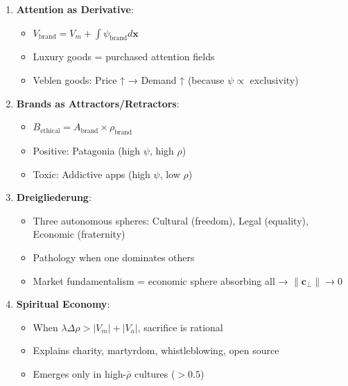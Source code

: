 \documentclass[11pt,a4paper]{article}
\theoremstyle{definition}
\theoremstyle{remark}
\newcommand{\cc}{\mathbf{c}}
\begin{document}
\begin{enumerate}
\begin{mdframed}[backgroundcolor=green!10,linewidth=2pt,linecolor=green!70!black]
\begin{enumerate}[nosep]
    \item \textbf{Attention as Derivative}:
        \begin{itemize}[nosep]
            \item \(V_{\text{brand}} = V_m + \int \psi_{\text{brand}} d\mathbf{x}\)
            \item Luxury goods = purchased attention fields
            \item Veblen goods: Price ↑ → Demand ↑ (because \(\psi \propto\) exclusivity)
        \end{itemize}
    
    \item \textbf{Brands as Attractors/Retractors}:
        \begin{itemize}[nosep]
            \item \(B_{\text{ethical}} = A_{\text{brand}} \times \rho_{\text{brand}}\)
            \item Positive: Patagonia (high \(\psi\), high \(\rho\))
            \item Toxic: Addictive apps (high \(\psi\), low \(\rho\))
        \end{itemize}
    
    \item \textbf{Dreigliederung}:
        \begin{itemize}[nosep]
            \item Three autonomous spheres: Cultural (freedom), Legal (equality), Economic (fraternity)
            \item Pathology when one dominates others
            \item Market fundamentalism = economic sphere absorbing all → \(\|\cc_\perp\| \to 0\)
        \end{itemize}
    
    \item \textbf{Spiritual Economy}:
        \begin{itemize}[nosep]
            \item When \(\lambda\Delta\rho > |V_m| + |V_a|\), sacrifice is rational
            \item Explains charity, martyrdom, whistleblowing, open source
            \item Emerges only in high-\(\bar{\rho}\) cultures (\(> 0.5\))
        \end{itemize}
    

\end{enumerate}
\end{mdframed}
\end{enumerate}
\end{document}
